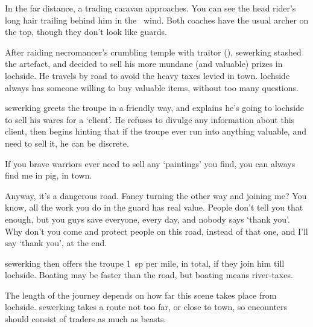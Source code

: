 \begin{boxtext}
  In the far distance, a trading caravan approaches.
  You can see the head rider's long hair trailing behind him in the \showTemperature\ wind.
  Both coaches have the usual archer on the top, though they don't look like \glspl{guard}.
\end{boxtext}

\begin{exampletext}
  After raiding \gls{necromancer}'s crumbling temple with \gls{traitor} (), \gls{sewerking} stashed the \gls{artefact}, and decided to sell his more mundane (and valuable) prizes in \gls{lochside}.
  He travels by road to avoid the heavy taxes levied in \gls{town}.
  \Gls{lochside} always has someone willing to buy valuable items, without too many questions.
\end{exampletext}

\Gls{sewerking} greets the troupe in a friendly way, and explains he's going to \gls{lochside} to sell his wares for a `client'.
He refuses to divulge any information about this client, then begins hinting that if the troupe ever run into anything valuable, and need to sell it, he can be discrete.


\begin{speechtext}
  If you brave warriors ever need to sell any `paintings' you find, you can always find me in \gls{pig}, in \gls{town}.

  Anyway, it's a dangerous road.
  Fancy turning the other way and joining me?
  You know, all the work you do in the \gls{guard} has real value.
  People don't tell you that enough, but you guys save everyone, every day, and nobody says `thank you'.
  Why don't you come and protect people on this road, instead of that one, and I'll say `thank you', at the end.
\end{speechtext}

\Gls{sewerking} then offers the troupe 1~\gls{sp} per mile, in total, if they join him till \gls{lochside}.
Boating may be faster than the road, but boating means river-taxes.

The length of the journey depends on how far this scene takes place from \gls{lochside}.
\Gls{sewerking} takes a route not too far, or close to town, so encounters should consist of traders as much as beasts.

